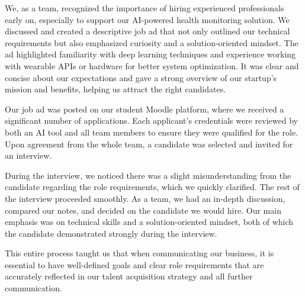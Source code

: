 \documentclass{article}
\begin{document}
We, as a team, recognized the importance of hiring experienced professionals early on, especially to support our AI-powered health monitoring solution. We discussed and created a descriptive job ad that not only outlined our technical requirements but also emphasized curiosity and a solution-oriented mindset. The ad highlighted familiarity with deep learning techniques and experience working with wearable APIs or hardware for better system optimization. It was clear and concise about our expectations and gave a strong overview of our startup's mission and benefits, helping us attract the right candidates.

Our job ad was posted on our student Moodle platform, where we received a significant number of applications. Each applicant's credentials were reviewed by both an AI tool and all team members to ensure they were qualified for the role. Upon agreement from the whole team, a candidate was selected and invited for an interview.

During the interview, we noticed there was a slight misunderstanding from the candidate regarding the role requirements, which we quickly clarified. The rest of the interview proceeded smoothly. As a team, we had an in-depth discussion, compared our notes, and decided on the candidate we would hire. Our main emphasis was on technical skills and a solution-oriented mindset, both of which the candidate demonstrated strongly during the interview.

This entire process taught us that when communicating our business, it is essential to have well-defined goals and clear role requirements that are accurately reflected in our talent acquisition strategy and all further communication.
\end{document}
